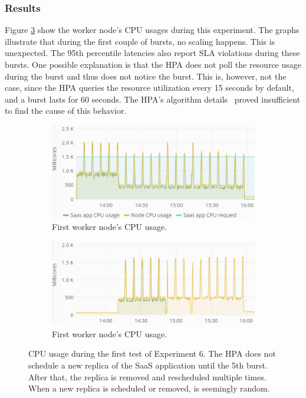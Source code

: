 \subsubsection{Results}
Figure \ref{fig:cpu-saas-hpa-bursty} show the worker node's CPU usages during this experiment. The graphs illustrate that during the first couple of bursts, no scaling happens. This is unexpected. The 95th percentile latencies also report SLA violations during these bursts. One possible explanation is that the HPA does not poll the resource usage during the burst and thus does not notice the burst. This is, however, not the case, since the HPA queries the resource utilization every 15 seconds by default, and a burst lasts for 60 seconds. The HPA's algorithm details~\citep{hpa-algorithm-details} proved insufficient to find the cause of this behavior.


\begin{figure}
\centering
\begin{subfigure}[b]{\columnwidth}
\centering
\includegraphics[width=0.75\columnwidth]{Images/Experiments/CPU/Grafana/cpu-saas-hpa-bursty-2-1.PNG}
\caption{First worker node's CPU usage.}
\label{fig:cpu-saas-hpa-bursty-2-1}
\end{subfigure}
\hfill
\begin{subfigure}[b]{\columnwidth}
\centering
\includegraphics[width=0.75\columnwidth]{Images/Experiments/CPU/Grafana/cpu-saas-hpa-bursty-2-2.PNG}
\caption{First worker node's CPU usage.}
\label{fig:cpu-saas-hpa-bursty-2-2}
\end{subfigure}
\hfill
\caption{CPU usage during the first test of Experiment 6. The HPA does not schedule a new replica of the SaaS application until the 5th burst. After that, the replica is removed and rescheduled multiple times. When a new replica is scheduled or removed, is seemingly random. }
\label{fig:cpu-saas-hpa-bursty}
\end{figure}

